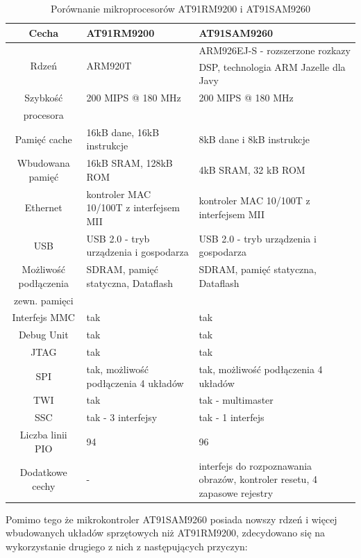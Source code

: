 \documentclass[a4paper,12pt]{book}
\begin{document}
				\begin{table}[]
					\extrarowheight=3pt
					\begin{tabularx}{\textwidth }{|c|X|X|}
						\hline \textbf{Cecha} &\textbf{AT91RM9200} & \textbf{AT91SAM9260} \\ 
						\hline Rdzeń & ARM920T & ARM926EJ-S - rozszerzone rozkazy DSP, technologia ARM Jazelle\textsuperscript{\textregistered} dla Javy \\
						\hline Szybkość & 200 MIPS @ 180 MHz & 200 MIPS @ 180 MHz \\
							procesora & & \\
						\hline Pamięć cache & 16kB dane, 16kB instrukcje & 8kB dane i 8kB instrukcje \\
						\hline Wbudowana pamięć & 16kB SRAM, 128kB ROM & 4kB SRAM, 32 kB ROM \\
						\hline Ethernet & kontroler MAC 10/100T z interfejsem MII & kontroler MAC 10/100T z interfejsem MII \\
						\hline USB & USB 2.0 - tryb urządzenia i gospodarza & USB 2.0 - tryb urządzenia i gospodarza \\
						\hline Możliwość podłączenia & SDRAM, pamięć statyczna, Dataflash & SDRAM, pamięć statyczna, Dataflash \\
							zewn. pamięci & & \\
						\hline Interfejs MMC & tak & tak \\
						\hline Debug Unit & tak & tak \\
						\hline JTAG & tak & tak \\
						\hline SPI & tak, możliwość podłączenia 4 układów & tak, możliwość podłączenia 4 układów \\
						\hline TWI & tak & tak - multimaster \\
						\hline SSC & tak - 3 interfejsy & tak - 1 interfejs \\
						\hline Liczba linii PIO & 94 & 96 \\
						\hline Dodatkowe cechy & - & interfejs do rozpoznawania obrazów, kontroler resetu, 4 zapasowe rejestry\\
						\hline 
					\end{tabularx}
					\caption{Porównanie mikroprocesorów AT91RM9200 i AT91SAM9260}
					\label{tab:arm_comparison}
				\end{table}
			Pomimo tego że mikrokontroler AT91SAM9260 posiada nowszy rdzeń i więcej wbudowanych układów sprzętowych niż AT91RM9200, zdecydowano się na wykorzystanie drugiego z nich z następujących przyczyn:
\end{document}
